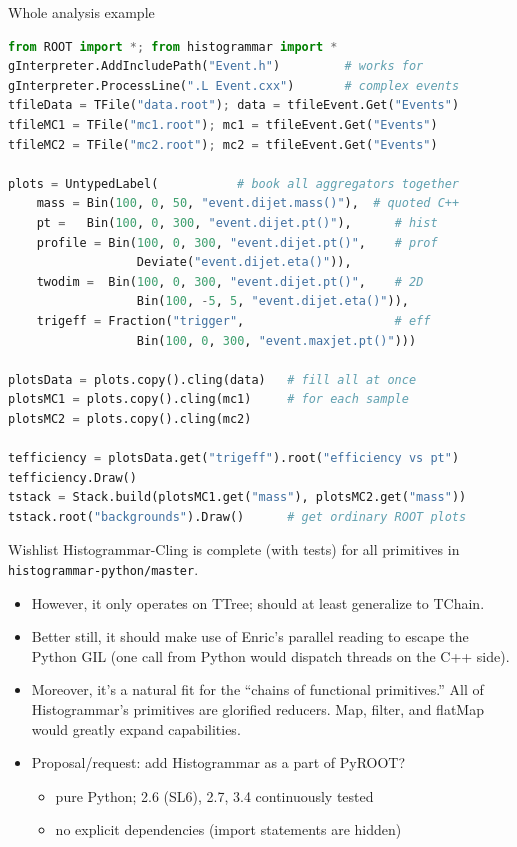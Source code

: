 \documentclass{beamer}
\begin{document}
\begin{frame}[fragile]{Whole analysis example}
\vspace{0.1 cm}
\begin{lstlisting}[language=python]
from ROOT import *; from histogrammar import *             
gInterpreter.AddIncludePath("Event.h")         # works for
gInterpreter.ProcessLine(".L Event.cxx")       # complex events
tfileData = TFile("data.root"); data = tfileEvent.Get("Events")
tfileMC1 = TFile("mc1.root"); mc1 = tfileEvent.Get("Events")
tfileMC2 = TFile("mc2.root"); mc2 = tfileEvent.Get("Events")

plots = UntypedLabel(           # book all aggregators together
    mass = Bin(100, 0, 50, "event.dijet.mass()"),  # quoted C++
    pt =   Bin(100, 0, 300, "event.dijet.pt()"),      # hist
    profile = Bin(100, 0, 300, "event.dijet.pt()",    # prof
                  Deviate("event.dijet.eta()")),
    twodim =  Bin(100, 0, 300, "event.dijet.pt()",    # 2D
                  Bin(100, -5, 5, "event.dijet.eta()")),
    trigeff = Fraction("trigger",                     # eff
                  Bin(100, 0, 300, "event.maxjet.pt()")))

plotsData = plots.copy().cling(data)   # fill all at once
plotsMC1 = plots.copy().cling(mc1)     # for each sample
plotsMC2 = plots.copy().cling(mc2)

tefficiency = plotsData.get("trigeff").root("efficiency vs pt")
tefficiency.Draw()
tstack = Stack.build(plotsMC1.get("mass"), plotsMC2.get("mass"))
tstack.root("backgrounds").Draw()      # get ordinary ROOT plots
\end{lstlisting}
\end{frame}

\begin{frame}{Wishlist}
\vspace{0.5 cm}
Histogrammar-Cling is complete (with tests) for all primitives in {\tt\small histogrammar-python/master}.

\setlength{\itemsep}{0.5 cm}
\begin{itemize}
\item However, it only operates on TTree; should at least generalize to TChain.
\item Better still, it should make use of Enric's parallel reading to escape the Python GIL (one call from Python would dispatch threads on the C++ side).
\item Moreover, it's a natural fit for the ``chains of functional primitives.'' All of Histogrammar's primitives are glorified reducers. Map, filter, and flatMap would greatly expand capabilities.
\item Proposal/request: add Histogrammar as a part of PyROOT?
\begin{itemize}
\item pure Python; 2.6 (SL6), 2.7, 3.4 continuously tested
\item no explicit dependencies (import statements are hidden)
\end{itemize}
\end{itemize}
\end{frame}
\end{document}
